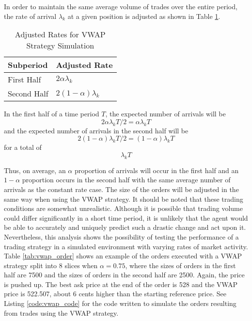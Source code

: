In order to maintain the same average volume of trades over the entire period, the rate of arrival $\lambda_k$ at a given position is adjusted as shown in Table \ref{tab:adjusted_rates}.

\begin{table}[htbp]
\caption{Adjusted Rates for VWAP Strategy Simulation} \label{tab:adjusted_rates}
\begin{center}
\begin{tabular}{l|l}
\textbf{Subperiod}            & \textbf{Adjusted Rate}             \\
\hline
First Half  & $2 \alpha \lambda_k $    \\
Second Half & $2 (1 - \alpha) \lambda_k$
\end{tabular}
\end{center}
\end{table}

In the first half of a time period $T$, the expected number of arrivals will be 
$$2 \alpha \lambda_k T / 2 = \alpha \lambda_k T$$ 
and the expected number of arrivals in the second half will be 
$$2 (1-\alpha) \lambda_k T / 2 = (1-\alpha) \lambda_k T$$
for a total of $$\lambda_k T$$

Thus, on average, an $\alpha$ proportion of arrivals will occur in the first half and an $1-\alpha$ proportion occurs in the second half with the same average number of arrivals as the constant rate case. The size of the orders will be adjusted in the same way when using the VWAP strategy. It should be noted that these trading conditions are somewhat unrealistic. Although it is possible that trading volume could differ significantly in a short time period, it is unlikely that the agent would be able to accurately and uniquely predict such a drastic change and act upon it. Nevertheless, this analysis shows the possibility of testing the performance of a trading strategy in a simulated environment with varying rates of market activity. Table \ref{tab:vwap_order} shows an example of the orders executed with a VWAP strategy split into 8 slices when $\alpha = 0.75$, where the sizes of orders in the first half are 7500 and the sizes of orders in the second half are 2500. Again, the price is pushed up. The best ask price at the end of the order is 528 and the VWAP price is 522.507, about 6 cents higher than the starting reference price. See Listing \ref{code:vwap_code} for the code written to simulate the orders resulting from trades using the VWAP strategy.

